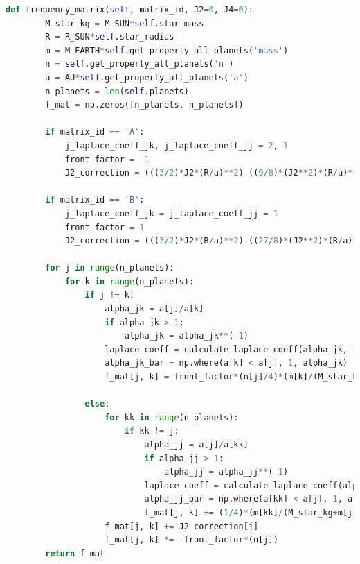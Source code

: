 \documentclass[11pt, oneside]{article}   	%
\begin{document}
\begin{lstlisting}[language=Python, caption={Calculating $\mathbf{A}$ and $\mathbf{B}$}, firstnumber=20]
    def frequency_matrix(self, matrix_id, J2=0, J4=0):
        M_star_kg = M_SUN*self.star_mass
        R = R_SUN*self.star_radius
        m = M_EARTH*self.get_property_all_planets('mass')
        n = self.get_property_all_planets('n')
        a = AU*self.get_property_all_planets('a')
        n_planets = len(self.planets)
        f_mat = np.zeros([n_planets, n_planets])

        if matrix_id == 'A':
            j_laplace_coeff_jk, j_laplace_coeff_jj = 2, 1
            front_factor = -1
            J2_correction = (((3/2)*J2*(R/a)**2)-((9/8)*(J2**2)*(R/a)**4)-((15/4)*J4*(R/a)**4))

        if matrix_id == 'B':
            j_laplace_coeff_jk = j_laplace_coeff_jj = 1
            front_factor = 1
            J2_correction = (((3/2)*J2*(R/a)**2)-((27/8)*(J2**2)*(R/a)**4)-((15/4)*J4*(R/a)**4))

        for j in range(n_planets):
            for k in range(n_planets):
                if j != k:
                    alpha_jk = a[j]/a[k]
                    if alpha_jk > 1:
                        alpha_jk = alpha_jk**(-1)
                    laplace_coeff = calculate_laplace_coeff(alpha_jk, j_laplace_coeff_jk, 3/2)
                    alpha_jk_bar = np.where(a[k] < a[j], 1, alpha_jk)
                    f_mat[j, k] = front_factor*(n[j]/4)*(m[k]/(M_star_kg+m[j]))*alpha_jk*alpha_jk_bar*laplace_coeff

                else:
                    for kk in range(n_planets):
                        if kk != j:
                            alpha_jj = a[j]/a[kk]
                            if alpha_jj > 1:
                                alpha_jj = alpha_jj**(-1)
                            laplace_coeff = calculate_laplace_coeff(alpha_jj, j_laplace_coeff_jj, 3/2)
                            alpha_jj_bar = np.where(a[kk] < a[j], 1, alpha_jj)
                            f_mat[j, k] += (1/4)*(m[kk]/(M_star_kg+m[j]))*alpha_jj*alpha_jj_bar*laplace_coeff
                    f_mat[j, k] += J2_correction[j]
                    f_mat[j, k] *= -front_factor*(n[j])
        return f_mat
\end{lstlisting}
\end{document}
